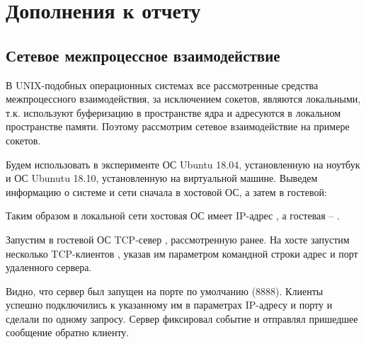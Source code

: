 \section*{Дополнения к отчету}

\subsection*{Сетевое межпроцессное взаимодействие}

В UNIX-подобных операционных системах все рассмотренные средства межпроцессного взаимодействия, за исключением сокетов, являются локальными, т.к. используют буферизацию в пространстве ядра и адресуются в локальном пространстве памяти. Поэтому рассмотрим сетевое взаимодействие на примере сокетов.

Будем использовать в эксперименте  ОС Ubuntu 18.04, установленную на ноутбук и ОС Ubunutu 18.10, установленную на виртуальной машине. Выведем информацию о системе и сети сначала в хостовой ОС, а затем в гостевой:



\noindent Таким образом в локальной сети хостовая ОС имеет IP-адрес , а гостевая -- .

Запустим в гостевой ОС TCP-север , рассмотренную ранее. На хосте запустим несколько TCP-клиентов , указав им параметром командной строки адрес и порт удаленного сервера.




Видно, что сервер был запущен на порте по умолчанию (8888). Клиенты успешно подключились к указанному им в параметрах IP-адресу и порту и сделали по одному запросу. Сервер фиксировал событие и отправлял пришедшее сообщение обратно клиенту.


